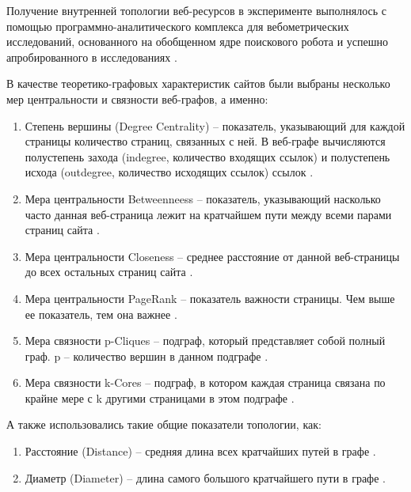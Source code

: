 Получение внутренней топологии веб-ресурсов в эксперименте выполнялось с помощью программно-аналитического комплекса для вебометрических исследований, основанного на обобщенном ядре поискового робота \cite{BlekanovSergeevMartynenko} и успешно апробированного в исследованиях \cite{BlekanovSergeevMaksimov,MaksimovBlekanov,BlekanovSergeevMaksimovBOWTIE}.

В качестве теоретико-графовых характеристик сайтов были выбраны несколько мер центральности и связности веб-графов, а именно:
\begin{enumerate}
	\item Степень вершины (Degree Centrality) -- показатель, указывающий для каждой страницы количество страниц, связанных с ней. В веб-графе вычисляются полустепень захода (indegree, количество входящих ссылок) и полустепень исхода (outdegree, количество исходящих ссылок) ссылок \cite{WassermanFaust,OrtegaAguillo}.
		\item Мера центральности Betweenneess -- показатель, указывающий насколько часто данная веб-страница лежит на кратчайшем пути между всеми парами страниц сайта \cite{WassermanFaust,OrtegaAguillo}.
		\item Мера центральности Closeness -- среднее расстояние от данной веб-страницы до всех остальных страниц сайта \cite{WassermanFaust}.
		\item Мера центральности PageRank -- показатель важности страницы. Чем выше ее показатель, тем она важнее \cite{PageBrinMotwani}.
		\item Мера связности p-Cliques -- подграф, который представляет собой полный граф. p -- количество вершин в данном подграфе \cite{OrtegaAguillo}.
		\item Мера связности k-Cores -- подграф, в котором каждая страница связана по крайне мере с k другими страницами в этом подграфе \cite{OrtegaAguillo}.
\end{enumerate}

А также использовались такие общие показатели топологии, как:
\begin{enumerate}
	\item Расстояние (Distance) -- средняя длина всех кратчайших путей в графе \cite{MaksimovBlekanov}. 
	\item Диаметр (Diameter) -- длина самого большого кратчайшего пути в графе \cite{MaksimovBlekanov}.
\end{enumerate}

